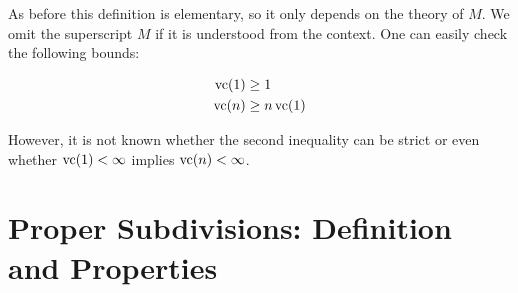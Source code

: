 \documentclass{amsart}
\begin{document}
As before this definition is elementary, so it only depends on the theory of $M$.
We omit the superscript $M$ if it is understood from the context.
One can easily check the following bounds:
\begin{Lemma} 
  \begin{align*}
    \operatorname{vc}(1) &\geq 1 \\
    \operatorname{vc}(n) &\geq n\operatorname{vc}(1)
  \end{align*}  
\end{Lemma}

However, it is not known whether the second inequality can be strict or even whether $\operatorname{vc}(1) < \infty$ implies $\operatorname{vc}(n) < \infty$.

\section{Proper Subdivisions: Definition and Properties}
\end{document}
